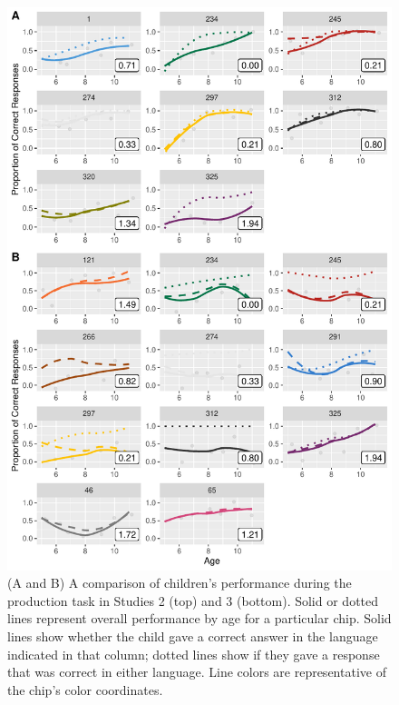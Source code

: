 \documentclass[
  english,
  ,man,floatsintext]{apa6}
\begin{document}
\begin{figure}
\centering
\includegraphics{amazon_color_files/figure-latex/prod-childfigure-1.pdf}
\caption{\label{fig:prod-childfigure}(A and B) A comparison of children's performance during the production task in Studies 2 (top) and 3 (bottom). Solid or dotted lines represent overall performance by age for a particular chip. Solid lines show whether the child gave a correct answer in the language indicated in that column; dotted lines show if they gave a response that was correct in either language. Line colors are representative of the chip's color coordinates.}
\end{figure}
\end{document}
